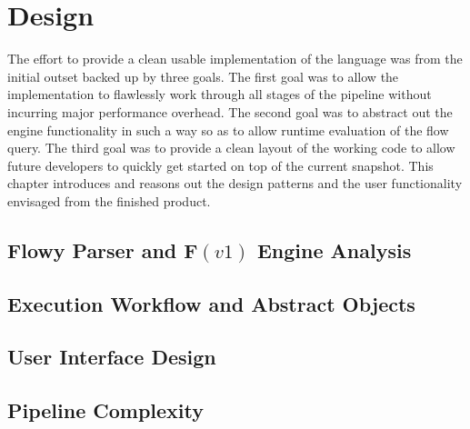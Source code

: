 \chapter{Design}\label{ch:design}

The effort to provide a clean usable implementation of the language was from
the initial outset backed up by three goals. The first goal was to allow the
implementation to flawlessly work through all stages of the pipeline without
incurring major performance overhead. The second goal was to abstract out the
engine functionality in such a way so as to allow runtime evaluation of the
flow query. The third goal was to provide a clean layout of the working code
to allow future developers to quickly get started on top of the current
snapshot. This chapter introduces and reasons out the design patterns and
the user functionality envisaged from the finished product.

\section{Flowy Parser and F$(v1)$ Engine Analysis}\label{sec:adt-workflow}


\section{Execution Workflow and Abstract Objects}\label{sec:adt-workflow}


\section{User Interface Design}\label{sec:engine-interface}
%

\section{Pipeline Complexity}\label{sec:engine-complexity}
%
